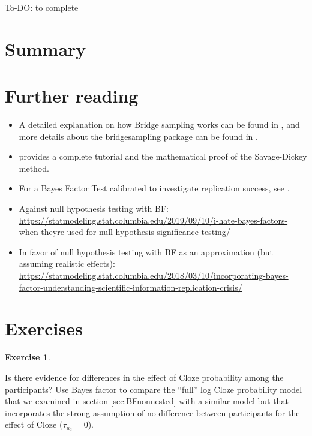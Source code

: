\documentclass[12pt,]{krantz}
\providecommand{\tightlist}{%
  \setlength{\itemsep}{0pt}\setlength{\parskip}{0pt}}
\theoremstyle{definition}
\theoremstyle{definition}
\theoremstyle{definition}
\newtheorem{exercise}{Exercise}[chapter]
\theoremstyle{remark}
\begin{document}
To-DO: to complete

\section{Summary}\label{summary-4}

\section{Further reading}\label{further-reading-6}

\begin{itemize}
\tightlist
\item
  A detailed explanation on how Bridge sampling works can be found in
  \citet{gronauTutorialBridgeSampling2017}, and more details about the
  bridgesampling package can be found in
  \citet{gronauBridgesamplingPackageEstimating2017}.
\item
  \citet{wagenmakers2010BayesianHypothesisTesting} provides a complete
  tutorial and the mathematical proof of the Savage-Dickey method.
\item
  For a Bayes Factor Test calibrated to investigate replication success,
  see \citet{verhagenBayesianTestsQuantify2014}.
\item
  Against null hypothesis testing with BF:
  \url{https://statmodeling.stat.columbia.edu/2019/09/10/i-hate-bayes-factors-when-theyre-used-for-null-hypothesis-significance-testing/}
\item
  In favor of null hypothesis testing with BF as an approximation (but
  assuming realistic effects):
  \url{https://statmodeling.stat.columbia.edu/2018/03/10/incorporating-bayes-factor-understanding-scientific-information-replication-crisis/}
\end{itemize}

\section{Exercises}\label{exercises-5}

\begin{exercise}
\protect\hypertarget{exr:byparticipants}{}{\label{exr:byparticipants} }
\end{exercise}

\vspace{-.5cm} Is there evidence for differences in the effect of Cloze
probability among the participants? Use Bayes factor to compare the
``full'' log Cloze probability model that we examined in section
\ref{sec:BFnonnested} with a similar model but that incorporates the
strong assumption of no difference between participants for the effect
of Cloze (\(\tau_{u_2}=0\)).
\end{document}
